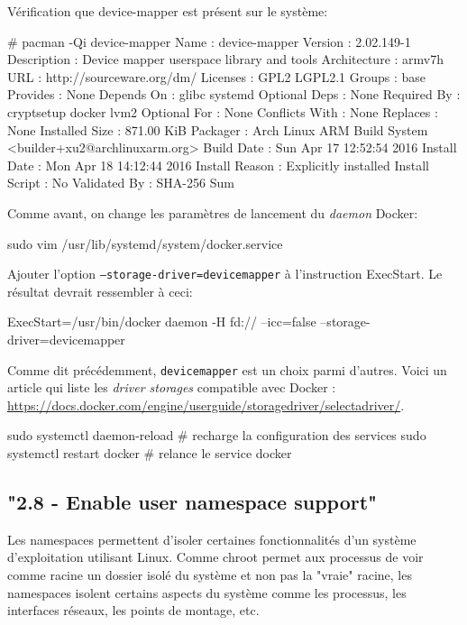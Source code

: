 \documentclass[11pt,a4paper,oneside]{report}
\newcommand{\code}[1]{\texttt{#1}}
\begin{document}
Vérification que device-mapper est présent sur le système:

\begin{bashcode}
# pacman -Qi device-mapper
Name            : device-mapper
Version         : 2.02.149-1
Description     : Device mapper userspace library and tools
Architecture    : armv7h
URL             : http://sourceware.org/dm/
Licenses        : GPL2  LGPL2.1
Groups          : base
Provides        : None
Depends On      : glibc  systemd
Optional Deps   : None
Required By     : cryptsetup  docker  lvm2
Optional For    : None
Conflicts With  : None
Replaces        : None
Installed Size  : 871.00 KiB
Packager        : Arch Linux ARM Build System <builder+xu2@archlinuxarm.org>
Build Date      : Sun Apr 17 12:52:54 2016
Install Date    : Mon Apr 18 14:12:44 2016
Install Reason  : Explicitly installed
Install Script  : No
Validated By    : SHA-256 Sum
\end{bashcode}

Comme avant, on change les paramètres de lancement du \textit{daemon} Docker:

\begin{bashcode}
sudo vim /usr/lib/systemd/system/docker.service
\end{bashcode}

Ajouter l'option \code{--storage-driver=devicemapper} à l'instruction ExecStart. Le résultat devrait ressembler à ceci:

\begin{bashcode}
ExecStart=/usr/bin/docker daemon -H fd:// --icc=false --storage-driver=devicemapper
\end{bashcode}

Comme dit précédemment, \code{devicemapper} est un choix parmi d'autres. Voici un article qui liste les \textit{driver storages} compatible avec Docker : \url{https://docs.docker.com/engine/userguide/storagedriver/selectadriver/}.

\begin{bashcode}
sudo systemctl daemon-reload # recharge la configuration des services
sudo systemctl restart docker # relance le service docker
\end{bashcode}


\subsection{"2.8 - Enable user namespace support"}
Les namespaces permettent d'isoler certaines fonctionnalités d'un système d'exploitation utilisant Linux. Comme chroot permet aux processus de voir comme racine un dossier isolé du système et non pas la "vraie" racine, les namespaces isolent certains aspects du système comme les processus, les interfaces réseaux, les points de montage, etc.
\end{document}
